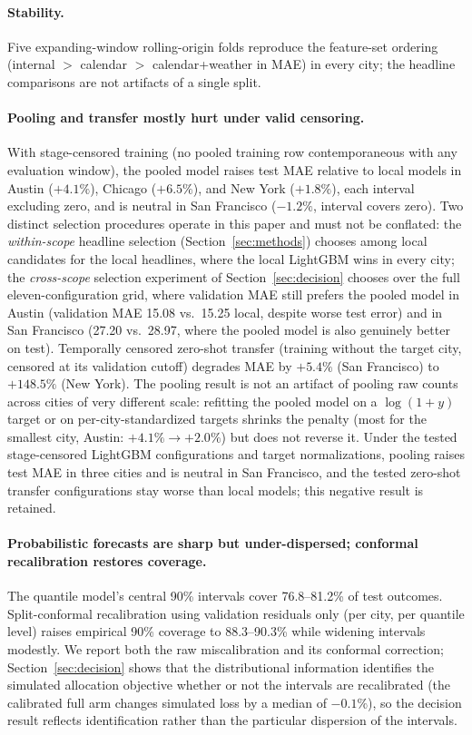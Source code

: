 \paragraph{Stability.}
Five expanding-window rolling-origin folds reproduce the feature-set
ordering (internal $>$ calendar $>$ calendar+weather in MAE) in every
city; the headline comparisons are not artifacts of a single split.

\paragraph{Pooling and transfer mostly hurt under valid censoring.}
With stage-censored training (no pooled training row contemporaneous with
any evaluation window), the pooled model raises test MAE relative to
local models in Austin ($+4.1\%$), Chicago ($+6.5\%$), and New York
($+1.8\%$), each interval excluding zero, and is neutral in San
Francisco ($-1.2\%$, interval covers zero). Two distinct selection
procedures operate in this paper and must not be conflated: the
\emph{within-scope} headline selection (Section~\ref{sec:methods}) chooses among local
candidates for the local headlines, where the local LightGBM wins in
every city; the \emph{cross-scope} selection experiment of Section~\ref{sec:decision}
chooses over the full eleven-configuration grid, where validation MAE
still prefers the pooled model in Austin (validation MAE 15.08 vs.\
15.25 local, despite worse test error) and in San Francisco (27.20 vs.\
28.97, where the pooled model is also genuinely better on test).
Temporally censored zero-shot transfer (training without the target city,
censored at its validation cutoff) degrades MAE by $+5.4\%$ (San
Francisco) to $+148.5\%$ (New York). The pooling result is not an artifact
of pooling raw counts across cities of very different scale: refitting the
pooled model on a $\log(1{+}y)$ target or on per-city-standardized targets
shrinks the penalty (most for the smallest city, Austin: $+4.1\%
\rightarrow +2.0\%$) but does not reverse it. Under the tested
stage-censored LightGBM configurations and target normalizations,
pooling raises test MAE in three cities and is neutral in San Francisco,
and the tested zero-shot transfer configurations stay worse than local
models; this negative result is retained.

\paragraph{Probabilistic forecasts are sharp but under-dispersed; conformal
recalibration restores coverage.}
The quantile model's central 90\% intervals cover 76.8--81.2\% of test
outcomes. Split-conformal recalibration using validation residuals only
(per city, per quantile level) raises empirical 90\% coverage to
88.3--90.3\% while widening intervals modestly. We report both the raw
miscalibration and its conformal correction; Section~\ref{sec:decision} shows that the
distributional information identifies the simulated allocation objective
whether or not the intervals are recalibrated (the calibrated full arm
changes simulated loss by a median of $-0.1\%$), so the decision result
reflects identification rather than the particular dispersion of the
intervals.

